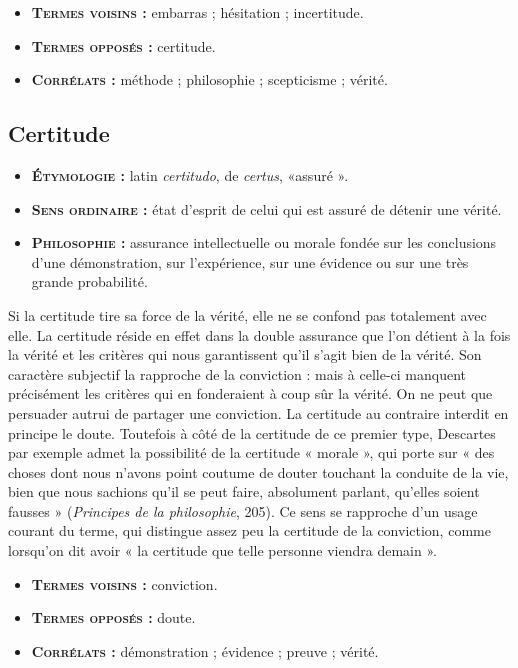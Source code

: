 {\footnotesize
\begin{itemize}[leftmargin=1cm, label=, itemsep=1pt]
\item {\bf \textsc{Termes voisins} :} embarras ; hésitation ;
incertitude.
\item {\bf \textsc{Termes opposés} :} certitude.
\item {\bf \textsc{Corrélats} :} méthode ; philosophie ;
scepticisme ; vérité.
\end{itemize}
}


\subsection{Certitude}

{\footnotesize
\begin{itemize}[leftmargin=1cm, label=, itemsep=1pt]
\item {\bf \textsc{Étymologie} :} latin {\it certitudo},
de {\it certus}, «assuré ».
\item {\bf \textsc{Sens ordinaire} :} état d'esprit
de celui qui est assuré de détenir une vérité.
\item {\bf \textsc{Philosophie} :} assurance intellectuelle
ou morale fondée sur les
conclusions d’une démonstration,
sur l'expérience, sur une évidence
ou sur une très grande probabilité.
\end{itemize}
}

Si la certitude tire sa force de la vérité,
elle ne se confond pas totalement avec
elle. La certitude réside en effet dans la
double assurance que l’on détient à la fois
la vérité et les critères qui nous garantissent
qu'il s’agit bien de la vérité. Son
caractère subjectif la rapproche de la
conviction : mais à celle-ci manquent
précisément les critères qui en fonderaient
à coup sûr la vérité. On ne peut
que persuader autrui de partager une
conviction. La certitude au contraire interdit
en principe le doute. Toutefois à côté
de la certitude de ce premier type, Descartes
par exemple admet la possibilité
de la certitude « morale », qui porte sur
« des choses dont nous n'avons point
coutume de douter touchant la conduite
de la vie, bien que nous sachions qu'il se
peut faire, absolument parlant, qu'elles
soient fausses » ({\it Principes de la
philosophie}, 205). Ce sens se rapproche d'un
usage courant du terme, qui distingue
assez peu la certitude de la conviction,
comme lorsqu'on dit avoir « la certitude
que telle personne viendra demain ».

{\footnotesize
\begin{itemize}[leftmargin=1cm, label=, itemsep=1pt]
\item {\bf \textsc{Termes voisins} :} conviction.
\item {\bf \textsc{Termes opposés} :} doute.
\item {\bf \textsc{Corrélats} :} démonstration ;
évidence ; preuve ; vérité.
\end{itemize}
}

